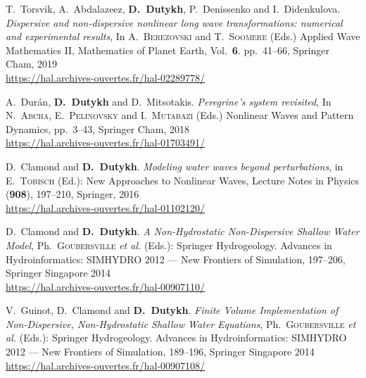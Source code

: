 \begin{etaremune}


  \item T.~Torsvik, A.~Abdalazeez, \textbf{D.~Dutykh}, P.~Denissenko and I.~Didenkulova. \textit{Dispersive and non-dispersive nonlinear long wave transformations: numerical and experimental results}, In A.~\textsc{Berezovski} and T.~\textsc{Soomere} (Eds.) Applied Wave Mathematics II, Mathematics of Planet Earth, Vol.~\textbf{6}. pp.~41--66, Springer Cham, 2019 \\ %
  \url{https://hal.archives-ouvertes.fr/hal-02289778/}
  


  \item A.~Dur\'an, \textbf{D.~Dutykh} and D.~Mitsotakis. \textit{Peregrine's system revisited}, In N.~\textsc{Abcha}, E.~\textsc{Pelinovsky} and I.~\textsc{Mutabazi} (Eds.) Nonlinear Waves and Pattern Dynamics, pp.~3--43, Springer Cham, 2018 \\ %
  \url{https://hal.archives-ouvertes.fr/hal-01703491/}
  


  \item D.~Clamond and \textbf{D.~Dutykh}. \textit{Modeling water waves beyond perturbations}, in E.~\textsc{Tobisch} (Ed.): New Approaches to Nonlinear Waves, Lecture Notes in Physics (\textbf{908}), 197--210, Springer, 2016 \\ %
  \url{https://hal.archives-ouvertes.fr/hal-01102120/}
  


  \item D.~Clamond and \textbf{D.~Dutykh}. \textit{A Non-Hydrostatic Non-Dispersive Shallow Water Model}, Ph.~\textsc{Goubersville} \emph{et al.} (Eds.): Springer Hydrogeology. Advances in Hydroinformatics: SIMHYDRO 2012 --- New Frontiers of Simulation, 197--206, Springer Singapore 2014 \\ %
  \url{https://hal.archives-ouvertes.fr/hal-00907110/}

  \item V.~Guinot, D.~Clamond and \textbf{D.~Dutykh}. \textit{Finite Volume Implementation of Non-Dispersive, Non-Hydrostatic Shallow Water Equations}, Ph.~\textsc{Goubersville} \emph{et al.} (Eds.): Springer Hydrogeology. Advances in Hydroinformatics: SIMHYDRO 2012 --- New Frontiers of Simulation, 189--196, Springer Singapore 2014 \\ %
  \url{https://hal.archives-ouvertes.fr/hal-00907108/}
  

\end{etaremune}
